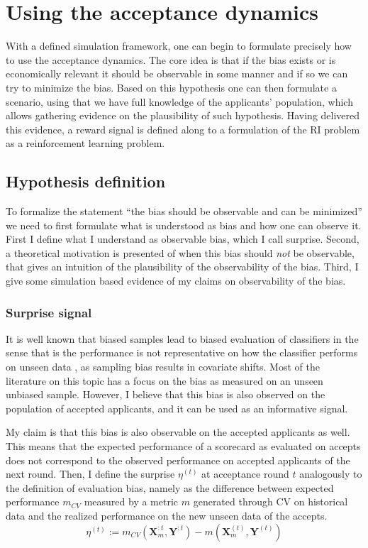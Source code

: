 \documentclass[
  12pt,
]{article}
\begin{document}
\newpage{}

\section{Using the acceptance
dynamics}\label{using-the-acceptance-dynamics}

With a defined simulation framework, one can begin to formulate
precisely how to use the acceptance dynamics. The core idea is that if
the bias exists or is economically relevant it should be observable in
some manner and if so we can try to minimize the bias. Based on this
hypothesis one can then formulate a scenario, using that we have full
knowledge of the applicants' population, which allows gathering evidence
on the plausibility of such hypothesis. Having delivered this evidence,
a reward signal is defined along to a formulation of the RI problem as a
reinforcement learning problem.

\subsection{Hypothesis definition}\label{hypothesis-definition}

To formalize the statement ``the bias should be observable and can be
minimized'' we need to first formulate what is understood as bias and
how one can observe it. First I define what I understand as observable
bias, which I call surprise. Second, a theoretical motivation is
presented of when this bias should \emph{not} be observable, that gives
an intuition of the plausibility of the observability of the bias.
Third, I give some simulation based evidence of my claims on
observability of the bias.

\subsubsection{Surprise signal}\label{surprise-signal}

It is well known that biased samples lead to biased evaluation of
classifiers in the sense that is the performance is not representative
on how the classifier performs on unseen data
\autocite{sugiyama2007covariate}, as sampling bias results in covariate
shifts. Most of the literature on this topic has a focus on the bias as
measured on an unseen unbiased sample. However, I believe that this bias
is also observed on the population of accepted applicants, and it can be
used as an informative signal.

My claim is that this bias is also observable on the accepted applicants
as well. This means that the expected performance of a scorecard as
evaluated on accepts does not correspond to the observed performance on
accepted applicants of the next round. Then, I define the surprise
\(\eta^{(t)}\) at acceptance round \(t\) analogously to the definition
of evaluation bias, namely as the difference between expected
performance \(m_{CV}\) measured by a metric \(m\) generated through CV
on historical data and the realized performance on the new unseen data
of the accepts. \[
\eta^{(t)} := m_{CV}\left(\mathbf{X}_m^{:t}, \mathbf{Y}^{:t}\right) - m\left(\mathbf{X}_m^{(t)}, \mathbf{Y}^{(t)}\right)
\]
\end{document}

